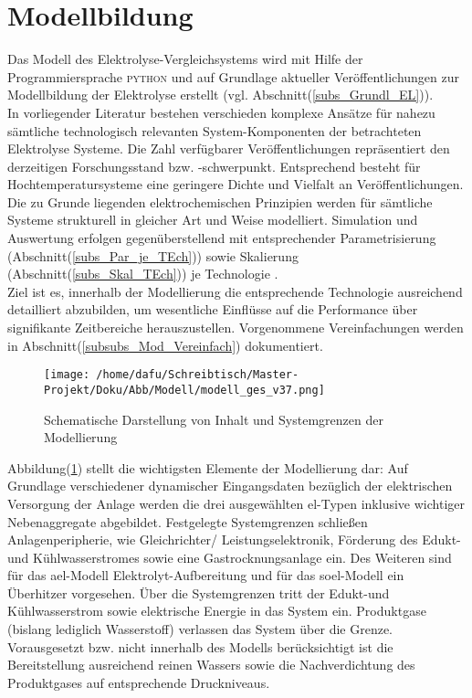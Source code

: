 \documentclass[onecolumn,10pt,titlepage]{article}
\begin{document}
\newpage
\section{Modellbildung}

Das Modell des Elektrolyse-Vergleichsystems wird mit Hilfe der Programmiersprache \textsc{python} und auf Grundlage aktueller Veröffentlichungen zur Modellbildung der Elektrolyse erstellt (vgl. Abschnitt(\ref{subs_Grundl_EL})).\\
In vorliegender Literatur bestehen verschieden komplexe Ansätze für nahezu sämtliche technologisch relevanten System-Komponenten der betrachteten Elektrolyse Systeme. Die Zahl verfügbarer Veröffentlichungen repräsentiert den derzeitigen Forschungsstand bzw. -schwerpunkt. Entsprechend besteht für Hochtemperatursysteme eine geringere Dichte und Vielfalt an Veröffentlichungen.\\
Die zu Grunde liegenden elektrochemischen Prinzipien werden für sämtliche Systeme strukturell in gleicher Art und Weise modelliert. Simulation und Auswertung erfolgen gegenüberstellend mit entsprechender Parametrisierung (Abschnitt(\ref{subs_Par_je_TEch})) sowie Skalierung (Abschnitt(\ref{subs_Skal_TEch})) je Technologie .\\
Ziel ist es, innerhalb der Modellierung die entsprechende Technologie ausreichend detailliert abzubilden, um wesentliche Einflüsse auf die Performance über signifikante Zeitbereiche %
herauszustellen. %
Vorgenommene Vereinfachungen werden in Abschnitt(\ref{subsubs_Mod_Vereinfach}) dokumentiert.
\begin{figure}[H]
	
	\centering
	\texttt{[image: /home/dafu/Schreibtisch/Master-Projekt/Doku/Abb/Modell/modell\_ges\_v37.png]}
	\caption[Inhalt und Systemgrenzen der Modellierung]{Schematische Darstellung von Inhalt und Systemgrenzen der Modellierung}
	\label{fig:Mod_Zielsetz} 
\end{figure}
Abbildung(\ref{fig:Mod_Zielsetz}) stellt die wichtigsten Elemente der Modellierung dar:
Auf Grundlage verschiedener dynamischer Eingangsdaten bezüglich der elektrischen Versorgung der Anlage werden die drei ausgewählten \gls{el}-Typen inklusive wichtiger Nebenaggregate abgebildet. Festgelegte Systemgrenzen schließen Anlagenperipherie, wie Gleichrichter/ Leistungselektronik, Förderung des Edukt- und Kühlwasserstromes sowie eine Gastrocknungsanlage ein. Des Weiteren sind für das \gls{ael}-Modell Elektrolyt-Aufbereitung und für das \gls{soel}-Modell ein Überhitzer vorgesehen. Über die Systemgrenzen tritt der Edukt-und Kühlwasserstrom sowie elektrische Energie in das System ein. Produktgase (bislang lediglich Wasserstoff) verlassen das System über die Grenze. Vorausgesetzt bzw. nicht innerhalb des Modells berücksichtigt ist die Bereitstellung ausreichend reinen Wassers sowie die Nachverdichtung des Produktgases auf entsprechende Druckniveaus.
\end{document}
